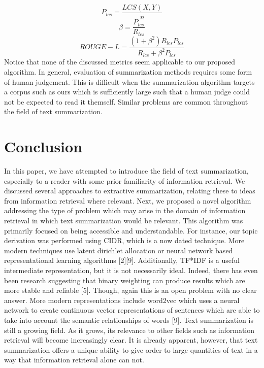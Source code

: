 \documentclass[11pt]{article}
\begin{document}
\begin{equation}
P_{lcs}=\frac{LCS(X,Y)}{n}
\end{equation}
\begin{equation}
\beta = \frac{P_{lcs}}{R_{lcs}}
\end{equation}
\begin{equation}
ROUGE-L = \frac{(1+\beta^2)R_{lcs}P_{lcs}}{R_{lcs}+\beta^2P_{lcs}}
\end{equation}
Notice that none of the discussed metrics seem applicable to our proposed algorithm. In general, evaluation of summarization methods requires some form of human judgement. This is difficult when the summarization algorithm targets a corpus such as ours which is sufficiently large such that a human judge could not be expected to read it themself. Similar problems are common throughout the field of text summarization. 
\section{Conclusion}
\label{sec:orgce050ac}
In this paper, we have attempted to introduce the field of text summarization, especially to a reader with some prior familiarity of information retrieval. We discussed several approaches to extractive summarization, relating these to ideas from information retrieval where relevant. Next, we proposed a novel algorithm addressing the type of problem which may arise in the domain of information retrieval in which text summarization would be relevant. This algorithm was primarily focused on being accessible and understandable. For instance, our topic derivation was performed using CIDR, which is a now dated technique. More modern techniques use latent dirichlet allocation or neural network based representational learning algorithms [2][9]. Additionally, TF*IDF is a useful intermediate representation, but it is not necessarily ideal. Indeed, there has even been research suggesting that binary weighting can produce results which are more stable and reliable [5]. Though, again this is an open problem with no clear answer. More modern representations include word2vec which uses a neural network to create continuous vector representations of sentences which are able to take into account the semantic relationships of words [9]. Text summarization is still a growing field. As it grows, its relevance to other fields such as information retrieval will become increasingly clear. It is already apparent, however, that text summarization offers a unique ability to give order to large quantities of text in a way that information retrieval alone can not.
\end{document}
